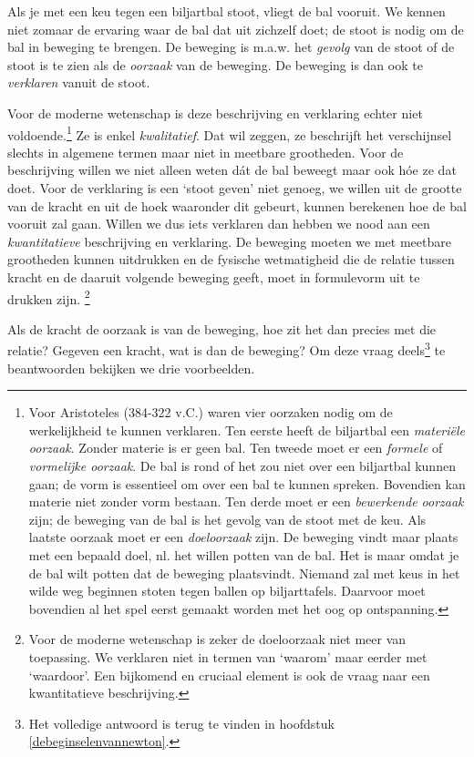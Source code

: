 \documentclass{ximera}
\begin{document}
	\author{Bart Lambregs}
    \xmsource



Als je met een keu tegen een biljartbal stoot, vliegt de bal vooruit. We kennen niet zomaar de ervaring waar de bal dat uit zichzelf doet; de stoot is nodig om de bal in beweging te brengen. De beweging is m.a.w. het \textit{gevolg} van de stoot of de stoot is te zien als de \textit{oorzaak} van de beweging. De beweging is dan ook te \textit{verklaren} vanuit de stoot.

Voor de moderne wetenschap is deze beschrijving en verklaring echter niet voldoende.\footnote{Voor Aristoteles (384-322 v.C.) waren vier oorzaken nodig om de werkelijkheid te kunnen verklaren. Ten eerste heeft de biljartbal een \textit{materi\"ele oorzaak}. Zonder materie is er geen bal. Ten tweede moet er een \textit{formele} of \textit{vormelijke oorzaak}. De bal is rond of het zou niet over een biljartbal kunnen gaan; de vorm is essentieel om over een bal te kunnen spreken. Bovendien kan materie niet zonder vorm bestaan. Ten derde moet er een \textit{bewerkende oorzaak} zijn; de beweging van de bal is het gevolg van de stoot met de keu. Als laatste oorzaak moet er een \textit{doeloorzaak} zijn. De beweging vindt maar plaats met een bepaald doel, nl. het willen potten van de bal. Het is maar omdat je de bal wilt potten dat de beweging plaatsvindt. Niemand zal met keus in het wilde weg beginnen stoten tegen ballen op biljarttafels. Daarvoor moet bovendien al het spel eerst gemaakt worden met het oog op ontspanning.} Ze is enkel \textit{kwalitatief}. Dat wil zeggen, ze beschrijft het verschijnsel slechts in algemene termen maar niet in meetbare grootheden. Voor de beschrijving willen we niet alleen weten d\'at de bal beweegt maar ook h\'oe ze dat doet. Voor de verklaring is een `stoot geven' niet genoeg, we willen uit de grootte van de kracht en uit de hoek waaronder dit gebeurt, kunnen berekenen hoe de bal vooruit zal gaan. Willen we dus iets verklaren dan hebben we nood aan een \textit{kwantitatieve} beschrijving en verklaring. De beweging moeten we met meetbare grootheden kunnen uitdrukken en de fysische wetmatigheid die de relatie tussen kracht en de daaruit volgende beweging geeft, moet in formulevorm uit te drukken zijn.
\footnote{Voor de moderne wetenschap is zeker de doeloorzaak niet meer van toepassing. We verklaren niet in termen van `waarom' maar eerder met `waardoor'. Een bijkomend en cruciaal element is ook de vraag naar een kwantitatieve beschrijving.}

Als de kracht de oorzaak is van de beweging, hoe zit het dan precies met die relatie? Gegeven een kracht, wat is dan de beweging? Om deze vraag deels\footnote{Het volledige antwoord is terug te vinden in hoofdstuk \ref{debeginselenvannewton}.} te beantwoorden bekijken we drie voorbeelden.
\end{document}
